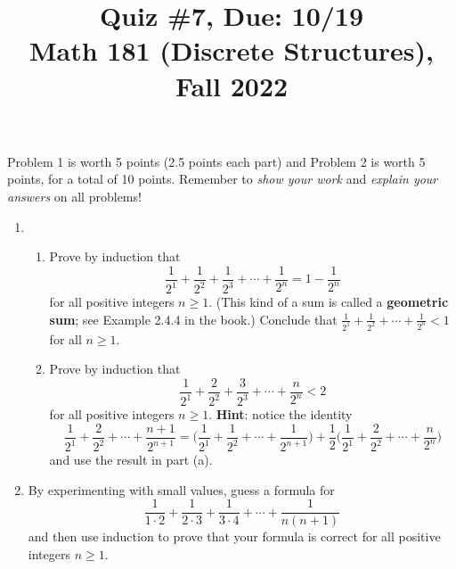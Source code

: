 \documentclass[11pt]{article}
\title{Quiz \#7, Due: 10/19 \\Math 181 (Discrete Structures), Fall 2022}
\date{}
\begin{document}
\maketitle

\thispagestyle{empty}

\vspace{-1cm}

Problem 1 is worth 5 points (2.5 points each part) and Problem 2 is worth 5 points, for a total of 10 points. Remember to \emph{show your work} and \emph{explain your answers} on all problems!

\begin{enumerate}
\item \begin{enumerate}
\item Prove by induction that
\[\frac{1}{2^1} + \frac{1}{2^2} + \frac{1}{2^3} + \cdots + \frac{1}{2^n} = 1- \frac{1}{2^n}\]
for all positive integers $n \geq 1$. (This kind of a sum is called a {\bf geometric sum}; see Example 2.4.4 in the book.) Conclude that $\frac{1}{2^1} + \frac{1}{2^2} + \cdots + \frac{1}{2^n}  < 1$ for all $n \geq 1$.
\item Prove by induction that
\[\frac{1}{2^1} + \frac{2}{2^2} + \frac{3}{2^3} + \cdots + \frac{n}{2^n} < 2\]
for all positive integers $n \geq 1$. {\bf Hint}: notice the identity
\[\frac{1}{2^1} + \frac{2}{2^2} + \cdots + \frac{n+1}{2^{n+1}} = \big ( \frac{1}{2^1} + \frac{1}{2^2} + \cdots + \frac{1}{2^{n+1}} \big ) + \frac{1}{2} \big(\frac{1}{2^1} + \frac{2}{2^2} + \cdots + \frac{n}{2^n}\big) \]
and use the result in part (a).
\end{enumerate}
\item By experimenting with small values, guess a formula for
\[\frac{1}{1\cdot 2} + \frac{1}{2 \cdot 3} + \frac{1}{3 \cdot 4} + \cdots + \frac{1}{n (n+1)}\]
and then use induction to prove that your formula is correct for all positive integers $n \geq 1$.
\end{enumerate}
\end{document}

